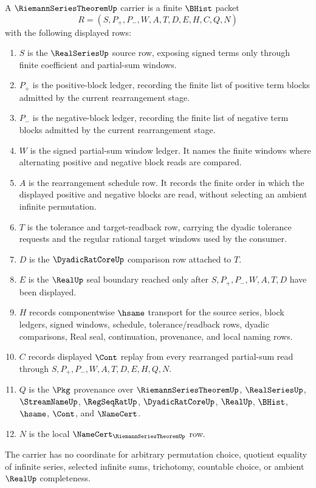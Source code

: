 \begin{definition}
\label{def:riemann-series-theorem-carrier}
A $\RiemannSeriesTheoremUp$ carrier is a finite $\BHist$ packet
$$
R=(S,P_{+},P_{-},W,A,T,D,E,H,C,Q,N)
$$
with the following displayed rows:
\begin{enumerate}
\item $S$ is the $\RealSeriesUp$ source row, exposing signed terms only through finite coefficient and partial-sum windows.
\item $P_{+}$ is the positive-block ledger, recording the finite list of positive term blocks admitted by the current rearrangement stage.
\item $P_{-}$ is the negative-block ledger, recording the finite list of negative term blocks admitted by the current rearrangement stage.
\item $W$ is the signed partial-sum window ledger. It names the finite windows where alternating positive and negative block reads are compared.
\item $A$ is the rearrangement schedule row. It records the finite order in which the displayed positive and negative blocks are read, without selecting an ambient infinite permutation.
\item $T$ is the tolerance and target-readback row, carrying the dyadic tolerance requests and the regular rational target windows used by the consumer.
\item $D$ is the $\DyadicRatCoreUp$ comparison row attached to $T$.
\item $E$ is the $\RealUp$ seal boundary reached only after $S,P_{+},P_{-},W,A,T,D$ have been displayed.
\item $H$ records componentwise $\hsame$ transport for the source series, block ledgers, signed windows, schedule, tolerance/readback rows, dyadic comparisons, Real seal, continuation, provenance, and local naming rows.
\item $C$ records displayed $\Cont$ replay from every rearranged partial-sum read through $S,P_{+},P_{-},W,A,T,D,E,H,Q,N$.
\item $Q$ is the $\Pkg$ provenance over $\RiemannSeriesTheoremUp$, $\RealSeriesUp$, $\StreamNameUp$, $\RegSeqRatUp$, $\DyadicRatCoreUp$, $\RealUp$, $\BHist$, $\hsame$, $\Cont$, and $\NameCert$.
\item $N$ is the local $\NameCert_{\RiemannSeriesTheoremUp}$ row.
\end{enumerate}
The carrier has no coordinate for arbitrary permutation choice, quotient equality of infinite series, selected infinite sums, trichotomy, countable choice, or ambient $\RealUp$ completeness.
\end{definition}

